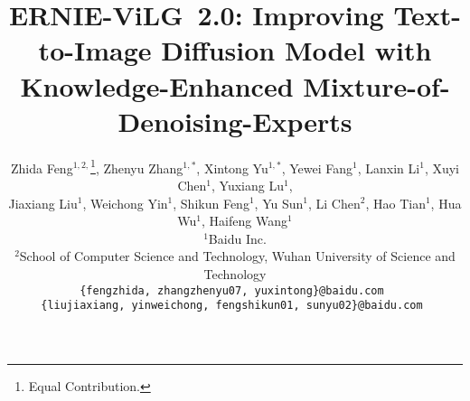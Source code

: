 \documentclass[10pt,twocolumn,letterpaper]{article}
\begin{document}
\title{ERNIE-ViLG~2.0: Improving Text-to-Image Diffusion Model with \\ Knowledge-Enhanced Mixture-of-Denoising-Experts}

\author{
Zhida Feng$^{1,2,}$\thanks{Equal Contribution.}\;, Zhenyu Zhang$^{1,*}$, Xintong Yu$^{1,*}$, Yewei Fang$^{1}$, Lanxin Li$^{1}$, Xuyi Chen$^{1}$, Yuxiang Lu$^{1}$, \\ Jiaxiang Liu$^{1}$, Weichong Yin$^{1}$, Shikun Feng$^{1}$, Yu Sun$^{1}$, Li Chen$^{2}$, Hao Tian$^{1}$, Hua Wu$^{1}$, Haifeng Wang$^{1}$ \\
$^{1}$Baidu Inc.\\
$^{2}$School of Computer Science and Technology, Wuhan University of Science and Technology \\
{\tt\small \{fengzhida, zhangzhenyu07, yuxintong\}@baidu.com } \\
{\tt\small \{liujiaxiang, yinweichong, fengshikun01, sunyu02\}@baidu.com } \\
}
\end{document}
